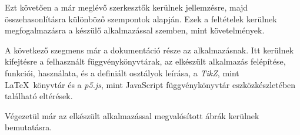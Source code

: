 Ezt követően a már meglévő szerkesztők kerülnek jellemzésre, majd összehasonlításra különböző szempontok alapján. Ezek a feltételek kerülnek megfogalmazásra a készülő alkalmazással szemben, mint követelmények.

 A következő szegmens már a dokumentáció része az alkalmazásnak. Itt kerülnek kifejtésre a felhasznált függvénykönyvtárak, az elkészült alkalmazás felépítése, funkciói, használata, és a definiált osztályok leírása, a \textit{TikZ}, mint \LaTeX\ könyvtár és a \textit{p5.js}, mint JavaScript függvénykönyvtár eszközkészletében található eltérések. 
 
 Végezetül már az elkészült alkalmazással megvalósított ábrák kerülnek bemutatásra.
